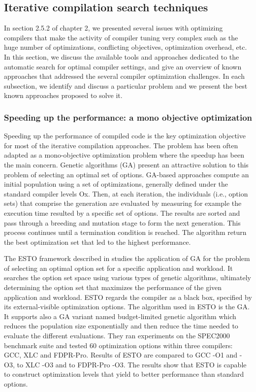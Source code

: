 \subsection{Iterative compilation search techniques}
In section 2.5.2 of chapter 2, we presented several issues with optimizing compilers that make the activity of compiler tuning very complex such as the huge number of optimizations, conflicting objectives, optimization overhead, etc.
In this section, we discuss the available tools and approaches dedicated to the automatic search for optimal compiler settings, and give an overview of known approaches that addressed the several compiler optimization challenges. In each subsection, we identify and discuss a particular problem and we present the best known approaches proposed to solve it.

\subsubsection{Speeding up the performance: a mono objective optimization}
Speeding up the performance of compiled code is the key optimization objective for most of the iterative compilation approaches. The problem has been often adapted as a mono-objective optimization problem where the speedup has been the main concern. Genetic algorithms (GA)\cite{stephenson2003genetic,bashkansky2007black} present an attractive solution to this problem of selecting an optimal set of options. 
GA-based approaches compute an initial population using a set of optimizations, generally defined under the standard compiler levels Ox. Then, at each iteration, the individuals (i.e., option sets) that comprise the generation are evaluated by measuring for example the execution time resulted by a specific set of options. The results are sorted and pass through a breeding and mutation stage to form the next generation. This
process continues until a termination condition is reached. The algorithm return the best optimization set that led to the highest performance.

The ESTO framework described in \cite{bashkansky2007black} studies the application of GA for the problem of selecting an optimal option set for a specific application and workload. It searches the option set space using various types of genetic algorithms, ultimately determining the option set that maximizes the performance of the given application and workload. ESTO regards the compiler as a black box, specified by its external-visible optimization options. The algorithm used in ESTO is the GA. It supports also a GA variant named budget-limited genetic algorithm which reduces the population size exponentially and then reduce the time needed to evaluate the different evaluations. They ran experiments on the SPEC2000 benchmark suite and tested 60 optimization options within three compilers: GCC, XLC and FDPR-Pro. Results of ESTO are compared to GCC -O1 and -O3, to XLC -O3 and to FDPR-Pro -O3. The results show that ESTO is capable to construct optimization levels that yield to better performance than standard options.



